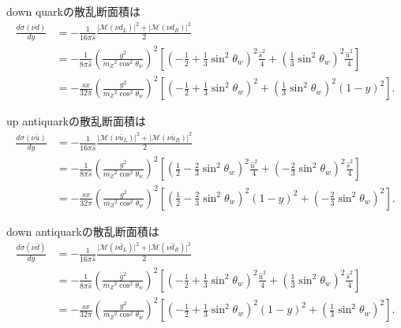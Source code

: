 down quarkの散乱断面積は
\begin{align*}
  \frac{d\sigma(\nu d)}{dy}
  &= - \frac{1}{16\pi \hat{s}} \frac{\lvert\mathcal{M}(\nu d_L)\rvert^2 + \lvert\mathcal{M}(\nu d_R)\rvert^2}{2} \\
  &= - \frac{1}{8\pi \hat{s}} \left(\frac{g^2}{m_Z{}^2\cos^2\theta_w}\right)^2
  \left[ \left(-\frac{1}{2} + \frac{1}{3}\sin^2\theta_w\right)^2 \frac{\hat{s}^2}{4}
  + \left( \frac{1}{3}\sin^2\theta_w\right)^2 \frac{\hat{u}^2}{4} \right] \\
  &= - \frac{sx}{32\pi} \left(\frac{g^2}{m_Z{}^2\cos^2\theta_w}\right)^2
  \left[ \left( -\frac{1}{2} + \frac{1}{3}\sin^2\theta_w\right)^2
  + \left( \frac{1}{3}\sin^2\theta_w\right)^2 (1-y)^2 \right] .
\end{align*}

up antiquarkの散乱断面積は
\begin{align*}
  \frac{d\sigma(\nu\bar{u})}{dy}
  &= - \frac{1}{16\pi \hat{s}} \frac{\lvert\mathcal{M}(\nu\bar{u}_L)\rvert^2 + \lvert\mathcal{M}(\nu\bar{u}_R)\rvert^2}{2} \\
  &= - \frac{1}{8\pi \hat{s}} \left(\frac{g^2}{m_Z{}^2\cos^2\theta_w}\right)^2
  \left[ \left(\frac{1}{2} - \frac{2}{3}\sin^2\theta_w\right)^2 \frac{\hat{u}^2}{4}
  + \left( - \frac{2}{3}\sin^2\theta_w\right)^2 \frac{\hat{s}^2}{4} \right] \\
  &= - \frac{sx}{32\pi} \left(\frac{g^2}{m_Z{}^2\cos^2\theta_w}\right)^2
  \left[ \left(\frac{1}{2} - \frac{2}{3}\sin^2\theta_w\right)^2 (1-y)^2
  + \left( - \frac{2}{3}\sin^2\theta_w\right)^2 \right] .
\end{align*}

down antiquarkの散乱断面積は
\begin{align*}
  \frac{d\sigma(\nu\bar{d})}{dy}
  &= - \frac{1}{16\pi \hat{s}} \frac{\lvert\mathcal{M}(\nu\bar{d}_L)\rvert^2 + \lvert\mathcal{M}(\nu\bar{d}_R)\rvert^2}{2} \\
  &= - \frac{1}{8\pi \hat{s}} \left(\frac{g^2}{m_Z{}^2\cos^2\theta_w}\right)^2
  \left[ \left(-\frac{1}{2} + \frac{1}{3}\sin^2\theta_w\right)^2 \frac{\hat{u}^2}{4}
  + \left( \frac{1}{3}\sin^2\theta_w\right)^2 \frac{\hat{s}^2}{4} \right] \\
  &= - \frac{sx}{32\pi} \left(\frac{g^2}{m_Z{}^2\cos^2\theta_w}\right)^2
  \left[ \left( -\frac{1}{2} + \frac{1}{3}\sin^2\theta_w\right)^2 (1-y)^2
  + \left( \frac{1}{3}\sin^2\theta_w\right)^2 \right] .
\end{align*}

